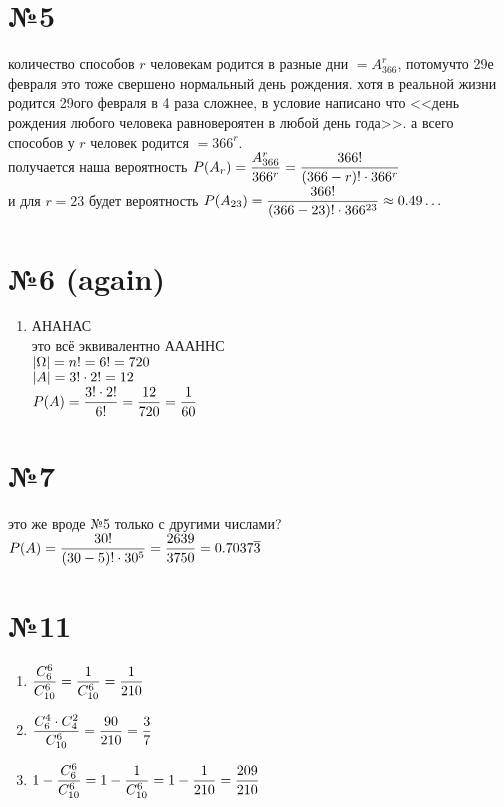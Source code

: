 \documentclass{article}
\begin{document}
  \section*{№5}
  количество способов $r$ человекам родится в разные дни $= A_{366}^r$,
  потомучто 29е февраля это тоже свершено нормальный день рождения.
  хотя в реальной жизни родится 29ого февраля в 4 раза сложнее, в условие написано что
  <<день рождения любого человека равновероятен в любой день года>>.
  а всего способов у $r$ человек родится $= 366^r$.
  \\ получается наша вероятность
  $\displaystyle P(A_r) = \frac{A_{366}^r}{366^r} = \frac{366!}{(366-r)! \cdot 366^r}$
  \\ и для $r = 23$ будет вероятность
  $\displaystyle P(A_{23}) = \frac{366!}{(366-23)! \cdot 366^{23}} \approx 0.49\dots$

  \section*{№6 (again)}
  \begin{enumerate}[start=3]
    \item АНАНАС \\
    это всё эквивалентно АААННС \\
    $\displaystyle \left|\Omega\right| = n! = 6! = 720 $ \\
    $\displaystyle \left|A\right| = 3! \cdot 2! = 12 $ \\
    $\displaystyle P(A) = \frac{3! \cdot 2!}{6!} = \frac{12}{720} = \frac{1}{60} $
  \end{enumerate}

  \section*{№7}
  это же вроде №5 только с другими числами? \\
  $\displaystyle P(A) = \frac{30!}{(30-5)! \cdot 30^5} = \frac{2639}{3750} = 0.7037\overline{3}$

  \section*{№11}
  \begin{enumerate}[label=\realasbuk*)]
    \item $\displaystyle \frac{C^6_6}{C^6_{10}} = \frac{1}{C^6_{10}} = \frac{1}{210}$
    \item $\displaystyle \frac{C^4_6 \cdot C^2_4}{C^6_{10}} = \frac{90}{210} = \frac{3}{7}$
    \item $\displaystyle 1-\frac{C^6_6}{C^6_{10}} = 1-\frac{1}{C^6_{10}} = 1-\frac{1}{210} = \frac{209}{210}$
  \end{enumerate}
\end{document}
